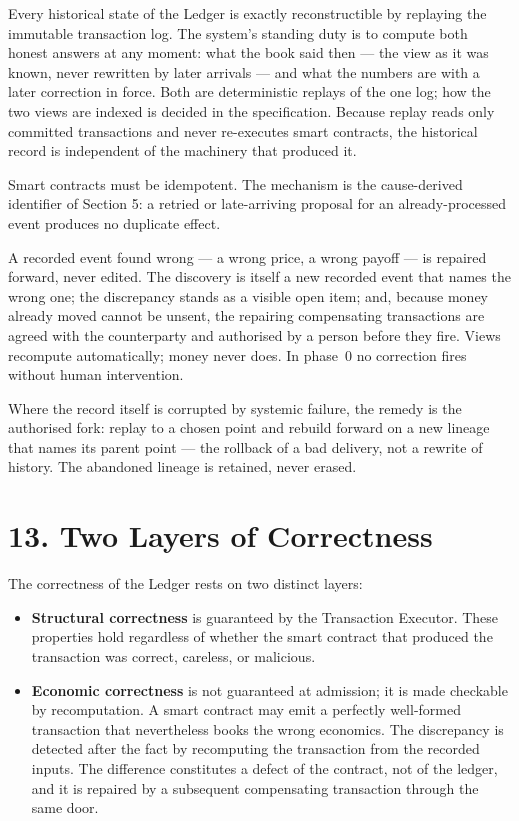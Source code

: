 \documentclass[11pt,a4paper]{article}
\newcommand{\clabel}[1]{\leavevmode\hypertarget{clause-#1}{}%
  \marginpar{\raggedright\scriptsize\ttfamily\textcolor{gray}{#1}}}
\providecommand{\tightlist}{\setlength{\itemsep}{2pt}\setlength{\parskip}{0pt}}
\begin{document}
\clabel{C-12.1}Every historical state of the Ledger is exactly
reconstructible by replaying the immutable transaction log. The
system's standing duty is to compute both honest answers at any moment:
what the book said then --- the view as it was known, never rewritten
by later arrivals --- and what the numbers are with a later correction
in force. Both are deterministic replays of the one log; how the two
views are indexed is decided in the specification.
\clabel{C-12.2}Because replay reads only committed transactions and
never re-executes smart contracts, the historical record is independent
of the machinery that produced it.

\clabel{C-12.3}Smart contracts must be idempotent. The mechanism is the
cause-derived identifier of Section 5: a retried or late-arriving
proposal for an already-processed event produces no duplicate effect.

\clabel{C-12.4}A recorded event found wrong --- a wrong price, a wrong
payoff --- is repaired forward, never edited. The discovery is itself a
new recorded event that names the wrong one; the discrepancy stands as
a visible open item; and, because money already moved cannot be unsent,
the repairing compensating transactions are agreed with the
counterparty and authorised by a person before they fire. Views
recompute automatically; money never does. In phase~0 no correction
fires without human intervention.

\clabel{C-12.5}Where the record itself is corrupted by systemic
failure, the remedy is the authorised fork: replay to a chosen point
and rebuild forward on a new lineage that names its parent point ---
the rollback of a bad delivery, not a rewrite of history. The abandoned
lineage is retained, never erased.

\hypertarget{two-layers-of-correctness}{%
\section{13. Two Layers of
Correctness}\label{two-layers-of-correctness}}

The correctness of the Ledger rests on two distinct layers:

\begin{itemize}
\tightlist
\item
  \clabel{C-13.1}\textbf{Structural correctness} is guaranteed by the Transaction
  Executor. These properties hold regardless of whether the smart
  contract that produced the transaction was correct, careless, or
  malicious.
\item
  \clabel{C-13.2}\textbf{Economic correctness} is not guaranteed at admission; it is
  made checkable by recomputation. A smart contract may emit a perfectly
  well-formed transaction that nevertheless books the wrong economics.
  The discrepancy is detected after the fact by recomputing the
  transaction from the recorded inputs. The difference constitutes a
  defect of the contract, not of the ledger, and it is repaired by a
  subsequent compensating transaction through the same door.
\end{itemize}
\end{document}
